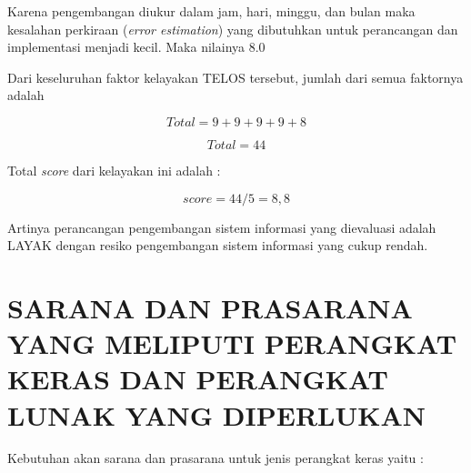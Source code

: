 \documentclass[pdftex,12pt, oneside]{article}
\begin{document}
\begin{enumerate}
Karena pengembangan diukur dalam jam, hari, minggu, dan bulan maka kesalahan perkiraan (\textit{error estimation}) yang dibutuhkan untuk perancangan dan implementasi menjadi kecil. Maka nilainya 8.0

\end{enumerate}

Dari keseluruhan faktor kelayakan TELOS tersebut, jumlah dari semua faktornya adalah 

\[ Total = 9 + 9 + 9 + 9 + 8 \]

\[ Total = 44 \]

Total \textit{score} dari kelayakan ini adalah :

\[ score = 44 / 5 = 8,8 \]

Artinya perancangan pengembangan sistem informasi yang dievaluasi adalah LAYAK dengan resiko pengembangan sistem informasi yang cukup rendah.

\section{SARANA DAN PRASARANA YANG MELIPUTI PERANGKAT KERAS DAN PERANGKAT LUNAK YANG DIPERLUKAN}

Kebutuhan akan sarana dan prasarana untuk jenis perangkat keras yaitu :
\end{document}

